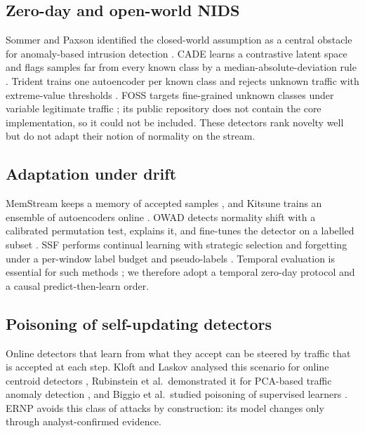 \documentclass[a4paper,fleqn]{cas-dc}
\newcommand{\ERNP}{ERNP\xspace}
\begin{document}
\subsection{Zero-day and open-world NIDS}
Sommer and Paxson identified the closed-world assumption as a central obstacle for anomaly-based intrusion detection \cite{sommer2010outside}. CADE learns a contrastive latent space and flags samples far from every known class by a median-absolute-deviation rule \cite{yang2021cade}. Trident trains one autoencoder per known class and rejects unknown traffic with extreme-value thresholds \cite{zhao2024trident}. FOSS targets fine-grained unknown classes under variable legitimate traffic \cite{zhao2024foss}; its public repository does not contain the core implementation, so it could not be included. These detectors rank novelty well but do not adapt their notion of normality on the stream.

\subsection{Adaptation under drift}
MemStream keeps a memory of accepted samples \cite{bhatia2022memstream}, and Kitsune trains an ensemble of autoencoders online \cite{mirsky2018kitsune}. OWAD detects normality shift with a calibrated permutation test, explains it, and fine-tunes the detector on a labelled subset \cite{han2023owad}. SSF performs continual learning with strategic selection and forgetting under a per-window label budget and pseudo-labels \cite{zhang2025ssf}. Temporal evaluation is essential for such methods \cite{pendlebury2019tesseract,arp2022dos}; we therefore adopt a temporal zero-day protocol and a causal predict-then-learn order.

\subsection{Poisoning of self-updating detectors}
Online detectors that learn from what they accept can be steered by traffic that is accepted at each step. Kloft and Laskov analysed this scenario for online centroid detectors \cite{kloft2012security}, Rubinstein et al.\ demonstrated it for PCA-based traffic anomaly detection \cite{rubinstein2009antidote}, and Biggio et al.\ studied poisoning of supervised learners \cite{biggio2012poisoning}. \ERNP avoids this class of attacks by construction: its model changes only through analyst-confirmed evidence.
\end{document}
